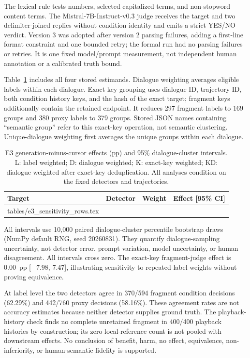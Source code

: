 \documentclass[12pt]{article}
\makeatletter
\newcommand{\tableinput}[1]{\@@input #1 }
\makeatother
\begin{document}
The lexical rule tests numbers, selected capitalized terms, and non-stopword content terms. The Mistral-7B-Instruct-v0.3 \citep{jiang2023Mistral7B,mistralAI2024Mistral7BInstructV03}  judge receives the target and two delimiter-joined replies without condition identity and emits a strict YES/NO verdict. Version 3 was adopted after version 2 parsing failures, adding a first-line format constraint and one bounded retry; the formal run had no parsing failures or retries. It is one fixed model/prompt measurement, not independent human annotation or a calibrated truth bound.

Table~\ref{tab:s-e3} includes all four stored estimands. Dialogue weighting averages eligible labels within each dialogue. Exact-key grouping uses dialogue ID, trajectory ID, both condition history keys, and the hash of the exact target; fragment keys additionally contain the retained endpoint. It reduces 297 fragment labels to 169 groups and 380 proxy labels to 379 groups. Stored JSON names containing ``semantic group'' refer to this exact-key operation, not semantic clustering. Unique-dialogue weighting first averages the unique groups within each dialogue.

\begin{table}[t]
\centering\small
\caption{E3 generation-minus-cursor effects (pp) and 95\% dialogue-cluster intervals. L: label weighted; D: dialogue weighted; K: exact-key weighted; KD: dialogue weighted after exact-key deduplication. All analyses condition on the fixed detectors and trajectories.}\label{tab:s-e3}
\begin{tabular}{@{}lllr@{}}
\toprule
Target & Detector & Weight & Effect [95\% CI] \\
\midrule
\tableinput{tables/e3_sensitivity_rows.tex}
\bottomrule
\end{tabular}
\end{table}

All intervals use 10,000 paired dialogue-cluster percentile bootstrap draws (NumPy default RNG, seed 20260831). They quantify dialogue-sampling uncertainty, not detector error, prompt variation, model uncertainty, or human disagreement. All intervals cross zero. The exact-key fragment-judge effect is 0.00~pp [$-7.98$, 7.47], illustrating sensitivity to repeated label weights without proving equivalence.

At label level the two detectors agree in 370/594 fragment condition decisions (62.29\%) and 442/760 proxy decisions (58.16\%). These agreement rates are not accuracy estimates because neither detector supplies ground truth. The playback-history check finds no complete unretained fragment in 400/400 playback histories by construction; its zero local-reference count is not pooled with downstream effects. No conclusion of benefit, harm, no effect, equivalence, non-inferiority, or human-semantic fidelity is supported.
\end{document}
